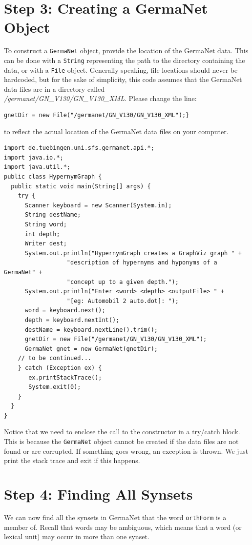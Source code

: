 \documentclass[12pt,a4paper,english,utf8]{report}
\begin{document}
\section{Step 3: Creating a GermaNet Object}
To construct a \texttt{GermaNet} object, provide the location of the GermaNet data. This can be done with a \texttt{String} representing the path to the directory containing the data, or with a \texttt{File} object. Generally speaking, file locations should never be hardcoded, but for the sake of simplicity, this code assumes that the GermaNet data files are in a directory called \\ \emph{/germanet/GN\_V130/GN\_V130\_XML}. Please change the line:

\begin{lstlisting}
gnetDir = new File("/germanet/GN_V130/GN_V130_XML");}
\end{lstlisting}

to reflect the actual location of the GermaNet data files on your computer.

\begin{lstlisting}
import de.tuebingen.uni.sfs.germanet.api.*;
import java.io.*;
import java.util.*;
public class HypernymGraph {
  public static void main(String[] args) {
    try {
      Scanner keyboard = new Scanner(System.in);
      String destName;
      String word;
      int depth;
      Writer dest;
      System.out.println("HypernymGraph creates a GraphViz graph " +
                  "description of hypernyms and hyponyms of a GermaNet" +
                  "concept up to a given depth.");
      System.out.println("Enter <word> <depth> <outputFile> " +
                  "[eg: Automobil 2 auto.dot]: ");
      word = keyboard.next();
      depth = keyboard.nextInt();
      destName = keyboard.nextLine().trim();
      gnetDir = new File("/germanet/GN_V130/GN_V130_XML");
      GermaNet gnet = new GermaNet(gnetDir);
	// to be continued...
    } catch (Exception ex) {
       ex.printStackTrace();
       System.exit(0);
    }
  }
}
\end{lstlisting}

Notice that we need to enclose the call to the constructor in a try/catch block. This is because the \texttt{GermaNet} object cannot be created if the data files are not found or are corrupted. If something goes wrong, an exception is thrown. We just print the stack trace and exit if this happens.



\section{Step 4: Finding All Synsets}
We can now find all the synsets in GermaNet that the word \texttt{orthForm} is a member of. Recall that words may be ambiguous, which means that a word (or lexical unit) may occur in more than one synset.
\end{document}
